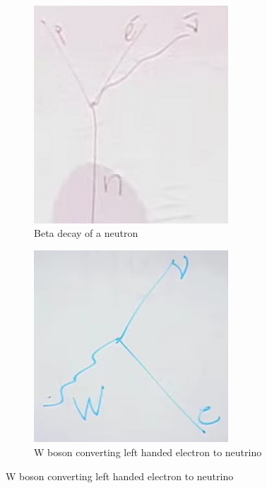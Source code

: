 \documentclass[]{article}
\begin{document}
\begin{figure}[H]
	\caption{The electron is always left handed in n weak interactions}
	\begin{subfigure}[t]{0.4\textwidth}
		\caption{Beta decay of a neutron}\label{fig:2-9-beta-decay-neutron}
		\includegraphics[width=0.8\textwidth]{2-9-beta-decay-neutron}
	\end{subfigure}
	\begin{subfigure}[t]{0.4\textwidth}
		\caption{W boson converting left handed electron to neutrino}\label{fig:2-9-W-boson}
		\includegraphics[width=0.8\textwidth]{2-9-W-boson}
	\end{subfigure}
\end{figure}
\end{document}

